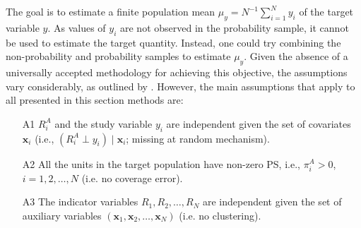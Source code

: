 \documentclass[
]{jss}
\begin{document}
\begin{table}[ht!]
    \centering
    \caption{Two sample setting}
    \label{tab-two-sources}
\end{table}

The goal is to estimate a finite population mean
\(\mu_y=N^{-1}\sum_{i=1}^{N} y_{i}\) of the target variable \(y\). As
values of \(y_{i}\) are not observed in the probability sample, it
cannot be used to estimate the target quantity. Instead, one could try
combining the non-probability and probability samples to estimate
\(\mu_y\). Given the absence of a universally accepted methodology for
achieving this objective, the assumptions vary considerably, as outlined
by \citet{wu2022statistical}. However, the main assumptions that apply
to all presented in this section methods are:

\begin{itemize}
\item[A1] $R_i^A$ and the study variable $y_i$ are independent given the set of covariates $\boldsymbol{x}_i$ (i.e., $\left(R_i^A \perp y_i\right) \mid \boldsymbol{x}_i$; missing at random mechanism).
\item[A2] All the units in the target population have non-zero PS, i.e., $\pi_i^A>0$, $i=1,2, \ldots, N$ (i.e. no coverage error).
\item[A3] The indicator variables $R_1, R_2, \ldots, R_N$ are independent given the set of auxiliary variables $\left(\boldsymbol{x}_1, \boldsymbol{x}_2, \ldots, \boldsymbol{x}_N\right)$ (i.e. no clustering).
\end{itemize}
\end{document}
